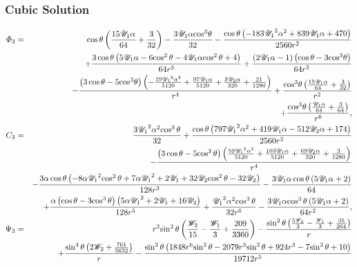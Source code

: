 \subsubsection{Cubic Solution}

\begin{eqnarray*}
\varPhi_3 &=& \cos\theta \left(\frac{15 \cU_1\alpha}{64} + \frac{3}{32}\right) - \frac{3 \cU_1\alpha {\cos}^3\theta}{32} - \frac{\cos\theta \left( - 183 {\cU_1}^2\alpha^2 + 839 \cU_1\alpha + 470\right)}{2560 r^2} \\ 
&&+ \frac{3 \cos\theta \left(5 \cU_1\alpha - 6 {\cos^2\theta} - 4 \cU_1\alpha {\cos^2\theta} + 4\right)}{64 r^3} + \frac{\left(2 \cU_1\alpha - 1\right) \left(\cos\theta - 3 {\cos}^3\theta\right)}{64 r^5} 
\\ 
&&- \frac{\left(3 \cos\theta - 5 {\cos}^3\theta\right) \left( - \frac{19 {\cU_1}^2\alpha^2}{5120} + \frac{97 \cU_1\alpha}{5120} + \frac{3 \cU_2\alpha}{320} + \frac{21}{1280}\right)}{r^4} + \frac{{\cos}^3\theta \left(\frac{15 \cU_1\alpha}{64} + \frac{3}{32}\right)}{r^2} \\ 
&&+ \frac{{\cos}^3\theta \left(\frac{\cU_1\alpha}{64} + \frac{3}{64}\right)}{r^6},
\\
C_3 &=&
\frac{3 {{\cU_1}}^2\alpha^2 {\cos^3\theta}}{32} + \frac{\cos\theta \left(797 {{\cU_1}}^2\alpha^2 + 419 {\cU_1}\alpha - 512 {\cU_2}\alpha + 174\right)}{2560 r^2} \\
&&- \frac{\left(3 \cos\theta - 5 {\cos^3\theta}\right) \left(\frac{59 {{\cU_1}}^2\alpha^2}{5120} + \frac{103 {\cU_1}\alpha}{5120} + \frac{69 {\cU_2}\alpha}{320} + \frac{3}{1280}\right)}{r^4} \\
&&- \frac{3\alpha \cos\theta \left( - 8\alpha {{\cU_1}}^2 {\cos^2\theta} + 7\alpha {{\cU_1}}^2 + 2 {\cU_1} + 32 {\cU_2} {\cos^2\theta} - 32 {\cU_2}\right)}{128 r^3} - \frac{3 {\cU_1}\alpha \cos\theta \left(5 {\cU_1}\alpha + 2\right)}{64} \\
&&+ \frac{\alpha \left(\cos\theta - 3 {\cos^3\theta}\right) \left(5\alpha {{\cU_1}}^2 + 2 {\cU_1} + 16 {\cU_2}\right)}{128 r^5} + \frac{{{\cU_1}}^2\alpha^2 {\cos^3\theta}}{32 r^6} - \frac{3 {\cU_1}\alpha {\cos^3\theta} \left(5 {\cU_1}\alpha + 2\right)}{64 r^2},
\\
\Psi_3 &=&
r^2 {\sin^2\theta} \left(\frac{{\cW_2}}{15} - \frac{{\cW_1}}{3} + \frac{209}{3360}\right) 
 - \frac{{\sin^2\theta} \left(\frac{5 {\cW_2}}{3} - \frac{{\cW_1}}{3} + \frac{35}{264}\right)}{r}
\\ && + \frac{{\sin^4\theta} \left(2 {\cW_2} + \frac{761}{5632}\right)}{r} - \frac{{\sin^2\theta} \left(1848 r^6 {\sin^2\theta} - 2079 r^3 {\sin^2\theta} + 924 r^3 - 7 {\sin^2\theta} + 10\right)}{19712 r^5} 

\end{eqnarray*}
